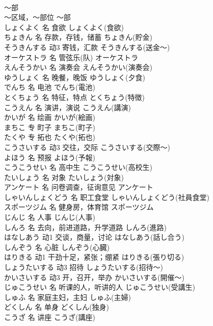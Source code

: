 \documentclass[8pt]{extreport}
\begin{document}
\begin{CJK}{UTF8}{min}
\\	～部	
\\	～区域，～部位	～部	
\\	しょくよく	名	食欲	しょくよく(食欲)	
\\	ちょきん	名	存款，存钱，储蓄	ちょきん(貯金)	
\\	そうきんする	动3	寄钱，汇款	そうきんする(送金～)	
\\	オーケストラ	名	管弦乐(队)	オーケストラ	
\\	えんそうかい	名	演奏会	えんそうかい(演奏会)	
\\	ゆうしょく	名	晚餐，晚饭	ゆうしょく(夕食)	
\\	でんち	名	电池	でんち(電池)	
\\	とくちょう	名	特征，特点	とくちょう(特徴)	
\\	こうえん	名	演讲，演说	こうえん(講演)	
\\	かいが	名	绘画	かいが(絵画)	
\\	まちこ	专	町子	まちこ(町子)	
\\	たくや	专	拓也	たくや(拓也)	
\\	こうさいする	动3	交往，交际	こうさいする(交際～)	
\\	よほう	名	预报	よほう(予報)	
\\	こうこうせい	名	高中生	こうこうせい(高校生)	
\\	たいしょう	名	对象	たいしょう(対象)	
\\	アンケート	名	问卷调查，征询意见	アンケート	
\\	しゃいんしょくどう	名	职工食堂	しゃいんしょくどう(社員食堂)	
\\	スポーツジム	名	健身房，体育馆	スポーツジム	
\\	じんじ	名	人事	じんじ(人事)	
\\	しんろ	名	去向，前进道路，升学道路	しんろ(進路)	
\\	はなしあう	动1	交谈，商量，讨论	はなしあう(話し合う)	
\\	しんぞう	名	心脏	しんぞう(心臓)	
\\	はりきる	动1	干劲十足，紧张；绷紧	はりきる(張り切る)	
\\	しょうたいする	动3	招待	しょうたいする(招待～)	
\\	かいさいする	动3	开，召开，举办	かいさいする(開催～)	
\\	じゅこうせい	名	听课的人，听讲的人	じゅこうせい(受講生)	
\\	しゅふ	名	家庭主妇，主妇	しゅふ(主婦)	
\\	どくしん	名	单身	どくしん(独身)	
\\	こうざ	名	讲座	こうざ(講座)	

\end{CJK}
\end{document}
